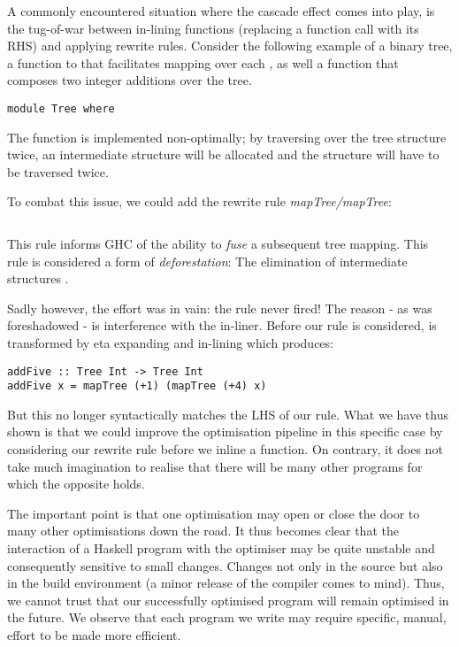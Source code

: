 A commonly encountered situation where the cascade effect comes into play,
is the tug-of-war between in-lining functions (replacing a function call with its RHS) and applying rewrite rules. Consider
the following example of a binary tree,  a function to that facilitates mapping over each , as well a function
that composes two integer additions over the tree.

\begin{verbatim}
module Tree where

\end{verbatim}

The  function is implemented non-optimally; by traversing
over the tree structure twice, an intermediate structure will be allocated
and the structure will have to be traversed twice.

To combat this issue, we could add the rewrite rule \textit{mapTree/mapTree}:
\begin{verbatim}
\end{verbatim}

This rule informs GHC of the ability to \textit{fuse} a subsequent tree mapping.
This rule is considered a form of \textit{deforestation}: 
The elimination of intermediate structures \cite{WADLER1990231}.

Sadly however, the effort was in vain: the rule never fired! The reason - as was
foreshadowed - is interference with the in-liner. Before our rule is considered, 
is transformed by eta expanding and in-lining  which produces: 

\begin{verbatim}
addFive :: Tree Int -> Tree Int
addFive x = mapTree (+1) (mapTree (+4) x)
\end{verbatim}

But this no longer syntactically matches the LHS of our  rule. What we have thus shown
is that we could improve the optimisation pipeline in this specific case by considering our
rewrite rule before we inline a function. On contrary, it does not take much imagination to
realise that there will be many other programs for which the opposite holds.

The important point is that one optimisation may open or close the door to many other
optimisations down the road. It thus becomes clear that the interaction of a Haskell program
with the optimiser may be quite unstable and consequently sensitive to small changes. 
Changes not only in the source but also in the build environment (a minor release of
the compiler comes to mind). Thus, we cannot trust that our successfully optimised program will remain
optimised in the future. We observe that each program we write may require specific, manual, 
effort to be made more efficient.
